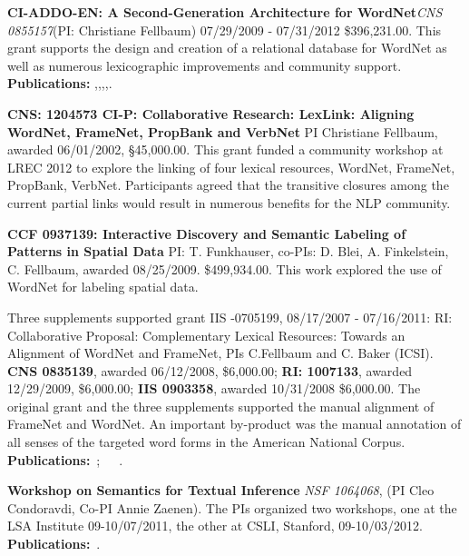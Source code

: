 \documentclass[10pt]{article}
\newcommand{\miniskip}{\vspace*{1mm}}
\begin{document}
\noindent
{\bf CI-ADDO-EN: A Second-Generation Architecture for WordNet}{\it CNS 0855157}(PI: Christiane Fellbaum) 07/29/2009 - 07/31/2012
\$396,231.00. This grant supports the design and creation of a relational database for WordNet as well as numerous lexicographic improvements 
and community support. {\bf Publications:} \cite{fellbaumvossen2012},\cite{fellbaumencyclopedia},\cite{fellbaumontology2010},\cite{chiarcosinpress},\cite{nikolova2012}.

\noindent
{\bf CNS: 1204573 CI-P: Collaborative Research: LexLink: Aligning WordNet, FrameNet, PropBank and VerbNet} PI Christiane Fellbaum, awarded 06/01/2002, 
\S45,000.00. This grant funded a community workshop at LREC 2012 to explore the linking of four lexical resources, WordNet, FrameNet, PropBank, VerbNet. 
Participants agreed that the transitive closures among the current partial links would result in numerous benefits for the NLP community. 

\noindent
{\bf CCF 0937139: Interactive Discovery and Semantic Labeling of Patterns in Spatial Data} PI: T. Funkhauser, co-PIs: D. Blei, A. Finkelstein, C. Fellbaum, awarded 08/25/2009.
\$499,934.00. This work explored the use of WordNet for labeling spatial data. 

\noindent
Three supplements supported grant IIS -0705199, 08/17/2007 - 07/16/2011: RI: Collaborative Proposal: Complementary Lexical Resources: 
Towards an Alignment of WordNet and FrameNet, PIs C.Fellbaum and C. Baker (ICSI). 
{\bf CNS 0835139}, awarded 06/12/2008, \$6,000.00; {\bf RI: 1007133}, awarded 12/29/2009, \$6,000.00; {\bf IIS 0903358}, awarded 10/31/2008 \$6,000.00. 
The original grant and the three supplements supported the manual alignment of FrameNet and WordNet. An important by-product was the manual 
annotation of all senses of the targeted word forms in the American National Corpus. {\bf Publications:}~\cite{fellbaumbakerLRE};~\cite{bakerfellbaum2008}~\cite{bakerfellbaum2009}~\cite{demelo2012}.


\noindent
{\bf Workshop on Semantics for Textual Inference}
{\it  NSF  1064068}, (PI Cleo Condoravdi, Co-PI Annie Zaenen). The PIs organized two workshops, one at the LSA Institute 09-10/07/2011, the other at CSLI, Stanford, 09-10/03/2012.
{\bf Publications:}~\cite{Lilt-special-issue}.

 \nocite{zaenen+karttunen:2013}
\nocite{csli-gang-cssp13}
\nocite{csli-gang-cil13}
\nocite{faust-adj-pol-lex}
\end{document}
